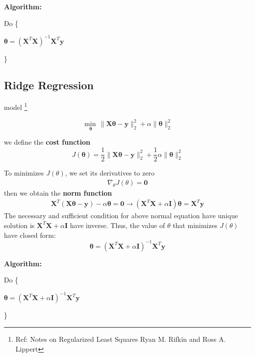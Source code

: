 \noindent \textbf{Algorithm:}

Do \{

	\qquad $\mathbf{\theta} = (\mathbf{X}^T\mathbf{X})^{-1}\mathbf{X}^T\mathbf{y}$

\}

		


\newpage
\subsection{Ridge Regression}
\noindent model 
\footnote{Ref: Notes on Regularized Least Squares Ryan M. Rifkin and Ross A. Lippert}

\begin{equation}
\underset{\mathbf{\theta}} {\min\,} {\| \mathbf{X}\mathbf{\theta} - \mathbf{y}\|_2^2} + \alpha \|\mathbf{\theta}\|_2^2
\end{equation}


\noindent we define the \textbf{cost function}
\begin{equation*}
	J(\mathbf{\theta}) = \frac{1}{2} \| \mathbf{X}\mathbf{\theta} - \mathbf{y} \|_2^2 + \frac{1}{2} \alpha\|\mathbf{\theta}\|_2^2
\end{equation*}


\noindent To minimizes $J(\theta)$, we set its derivatives to zero
\begin{align*}
			\nabla_{\theta} J(\theta) =  \mathbf{0}
\end{align*}
then we obtain the \textbf{norm function}
\begin{align*}
	\mathbf{X}^T(\mathbf{X}\mathbf{\theta} - \mathbf{y}) - \alpha \mathbf{\theta} = \mathbf{0} \rightarrow (\mathbf{X}^T\mathbf{X} + \alpha \mathbf{I})\mathbf{\theta} = \mathbf{X}^T\mathbf{y}
\end{align*}
\noindent The necessary and sufficient condition for above normal equation have unique solution is $\mathbf{X}^T\mathbf{X} + \alpha \mathbf{I}$ have inverse. Thus, the value of $\theta$ that minimizes $J(\theta)$ have closed form:
\[
\mathbf{\theta} = (\mathbf{X}^T\mathbf{X} + \alpha \mathbf{I})^{-1}\mathbf{X}^T\mathbf{y}
\]


\noindent \textbf{Algorithm:}

Do \{

	\qquad $\mathbf{\theta} = (\mathbf{X}^T\mathbf{X} + \alpha \mathbf{I})^{-1}\mathbf{X}^T\mathbf{y}$

\}



